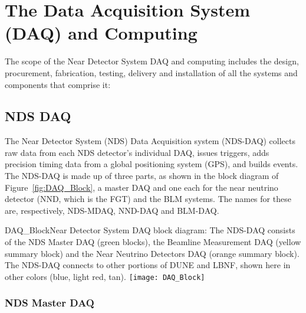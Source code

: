 \section{The Data Acquisition System (DAQ) and Computing}
\label{cdrsec:detectors-nd-ref-daq-comp}

The scope of the Near Detector System DAQ and computing includes the design, procurement, fabrication, testing, delivery and installation of all the systems and components that comprise it: 


\subsection{NDS DAQ}
\label{cdrsec:nd-gdaq-intro}

The Near Detector System (NDS) Data Acquisition system (NDS-DAQ) collects raw data from each NDS 
detector's individual DAQ, issues triggers, adds precision timing 
data from a global positioning system (GPS), and builds events. 
The NDS-DAQ is made up of three parts, as shown in the block diagram of 
Figure~\ref{fig:DAQ_Block}, a master DAQ and one each for the near neutrino detector (NND, which is the FGT) and the BLM systems. The names for these are, respectively, NDS-MDAQ, NND-DAQ and BLM-DAQ.

\begin{cdrfigure}{DAQ_Block}{Near Detector System DAQ block diagram: The NDS-DAQ consists 
of the NDS Master DAQ (green blocks), the Beamline Measurement DAQ (yellow summary 
block) and the Near Neutrino Detectors DAQ (orange summary block).  The 
NDS-DAQ connects to other portions of DUNE and LBNF, shown here in other colors (blue, 
light red, tan).}
\texttt{[image: DAQ\_Block]}
\end{cdrfigure}

\subsubsection{NDS Master DAQ} 
\label{cdrsec:nd-master-daq}

